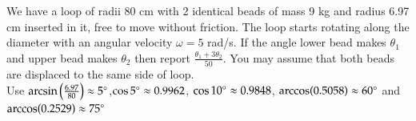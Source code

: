 \documentclass[11pt,a4paper]{scrartcl}
\begin{document}
\begin{problem}

We have a loop of radii 80 cm with 2 identical beads of mass 9 kg and radius 6.97 cm inserted in it, free to move without friction. The loop starts rotating along the diameter with an angular velocity $\omega=5$ rad/s. If the angle lower bead makes $\theta_1$ and upper bead makes $\theta_2$ then report $\boxed{\frac{\theta_1 + 3\theta_2}{50}}$. You may assume that both beads are displaced to the same side of loop. \\

Use $\arcsin\left(\frac{6.97}{80}\right) \approx  5\degree$,$\cos 5\degree \approx 0.9962$, $\cos 10 \degree \approx 0.9848$, $\arccos(0.5058) \approx 60 \degree $ and $\arccos(0.2529) \approx 75\degree$


\begin{center}
    


\begin{tikzpicture}[x=0.75pt,y=0.75pt,yscale=-1,xscale=1]


\end{tikzpicture}
\end{center}
\end{problem}
\end{document}
